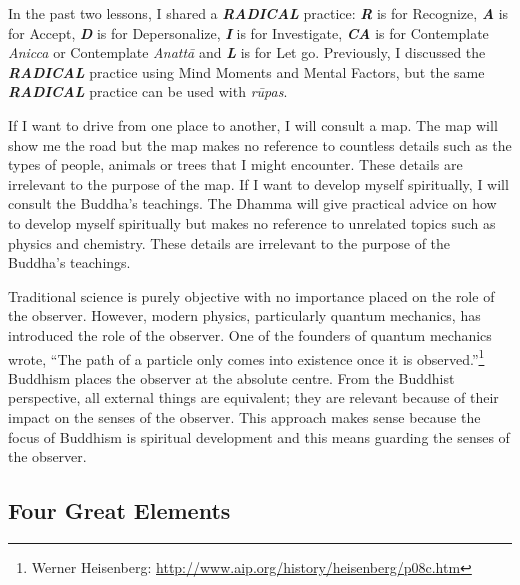 In the past two lessons, I shared a \textbf{\textit{RADICAL}} practice: \textbf{\textit{R}} is for Recognize, \textbf{\textit{A}} is for Accept, \textbf{\textit{D}} is for Depersonalize, \textbf{\textit{I}} is for Investigate, \textbf{\textit{CA}} is for Contemplate \textit{Anicca} or Contemplate \textit{Anattā} and \textit{\textbf{L}} is for Let go. Previously, I discussed the \textbf{\textit{RADICAL}} practice using Mind Moments and Mental Factors, but the same \textbf{\textit{RADICAL}} practice can be used with \textit{rūpas}.

If I want to drive from one place to another, I will consult a map. The map will show me the road but the map makes no reference to countless details such as the types of people, animals or trees that I might encounter. These details are irrelevant to the purpose of the map. If I want to develop myself spiritually, I will consult the Buddha’s teachings. The Dhamma will give practical advice on how to develop myself spiritually but makes no reference to unrelated topics such as physics and chemistry. These details are irrelevant to the purpose of the Buddha’s teachings.

Traditional science is purely objective with no importance placed on the role of the observer. However, modern physics, particularly quantum mechanics, has introduced the role of the observer. One of the founders of quantum mechanics wrote, “The path of a particle only comes into existence once it is observed.”\footnote{Werner Heisenberg: \url{http://www.aip.org/history/heisenberg/p08c.htm}} Buddhism places the observer at the absolute centre. From the Buddhist perspective, all external things are equivalent; they are relevant because of their impact on the senses of the observer. This approach makes sense because the focus of Buddhism is spiritual development and this means guarding the senses of the observer.

\subsection*{Four Great Elements}

